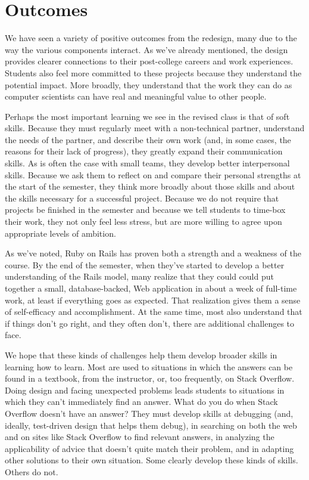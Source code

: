 \section{Outcomes}

We have seen a variety of positive outcomes from the redesign,
many due to the way the various components interact.
As we've already mentioned, the design provides clearer
connections to their post-college careers and work experiences.
Students also feel more committed to these projects
because they understand the potential impact.  More broadly, they
understand that the work they can do as computer scientists can
have real and meaningful value to other people.

Perhaps the most important learning we see in the revised class is
that of soft skills.  Because they must regularly meet with a
non-technical partner, understand the needs of the partner, and
describe their own work (and, in some cases, the reasons for their
lack of progress), they greatly expand their communication skills.
As is often the case with small teams, they develop better interpersonal
skills.  Because we ask them to reflect on and compare their personal
strengths at the start of the semester,
they think more broadly
about those skills and about the skills necessary for a successful
project.  
Because we do
not require that projects be finished in the semester and because
we tell students to time-box their work, they not only feel
less stress, but are more willing to agree upon appropriate levels
of ambition. 

As we've noted, Ruby on Rails has proven both a strength and a weakness
of the course.  By the end of the semester, when they've started to develop
a better understanding of the Rails model, many realize that they could
could put together a small, database-backed, Web application
in about a week of full-time work, at least if everything goes as
expected.  
That realization gives them a sense of self-efficacy
and accomplishment.  At the same time, most also understand that if things
don't go right, and they often don't, there are additional challenges
to face.

We hope that these kinds of challenges help them develop broader
skills in learning how to learn.  Most are used to situations in
which the answers can be found in a textbook, from the instructor,
or, too frequently, on Stack Overflow.  Doing design and facing 
unexpected problems leads students to situations in
which they can't immediately find an answer.  What do you do when
Stack Overflow doesn't have an answer?  They must develop skills
at debugging (and, ideally, test-driven design that helps them
debug), in searching on both the web and on sites like Stack Overflow
to find relevant answers, in analyzing the applicability of advice
that doesn't quite match their problem, and in adapting other
solutions to their own situation.  Some clearly develop these kinds
of skills.  Others do not.

